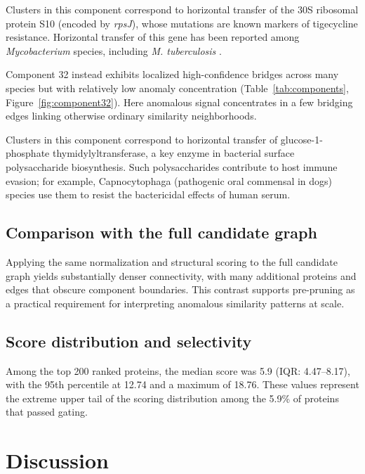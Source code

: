 \documentclass[11pt]{article}
\begin{document}
Clusters in this component correspond to horizontal transfer of the 30S ribosomal protein S10 (encoded by \textit{rpsJ}), whose mutations are known markers of tigecycline resistance\cite{rpsJ_tigecycline}. Horizontal transfer of this gene has been reported among \textit{Mycobacterium} species, including \textit{M. tuberculosis} \cite{mycobacterium_rpsJ_transfer}.

Component 32 instead exhibits localized high-confidence bridges across many species but with relatively low anomaly concentration (Table~\ref{tab:components}, Figure~\ref{fig:component32}). Here anomalous signal concentrates in a few bridging edges linking otherwise ordinary similarity neighborhoods. 

Clusters in this component correspond to horizontal transfer of glucose-1-phosphate thymidylyltransferase, a key enzyme in bacterial surface polysaccharide biosynthesis. Such polysaccharides contribute to host immune evasion; for example, Capnocytophaga (pathogenic oral commensal in dogs) species use them to resist the bactericidal effects of human serum\cite{capnocytophaga_surface_polysaccharide,capnocytophaga_serum_resistance}.

\subsection{Comparison with the full candidate graph}

Applying the same normalization and structural scoring to the full candidate graph yields substantially denser connectivity, with many additional proteins and edges that obscure component boundaries. This contrast supports pre-pruning as a practical requirement for interpreting anomalous similarity patterns at scale.

\subsection{Score distribution and selectivity}

Among the top 200 ranked proteins, the median score was 5.9 (IQR: 4.47–8.17), with the 95th percentile at 12.74 and a maximum of 18.76. These values represent the extreme upper tail of the scoring distribution among the 5.9\% of proteins that passed gating.

\FloatBarrier

\section{Discussion}
\label{sec:discussion}
\end{document}
